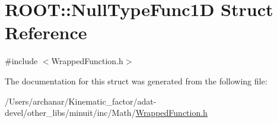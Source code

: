 \hypertarget{structROOT_1_1Math_1_1NullTypeFunc1D}{}\section{R\+O\+OT\+:\+:Null\+Type\+Func1D Struct Reference}
\label{structROOT_1_1Math_1_1NullTypeFunc1D}


{\ttfamily \#include $<$Wrapped\+Function.\+h$>$}



The documentation for this struct was generated from the following file\+:\begin{DoxyCompactItemize}
\item 
/\+Users/archanar/\+Kinematic\+\_\+factor/adat-\/devel/other\+\_\+libs/minuit/inc/\+Math/\mbox{\hyperlink{adat-devel_2other__libs_2minuit_2inc_2Math_2WrappedFunction_8h}{Wrapped\+Function.\+h}}\end{DoxyCompactItemize}
